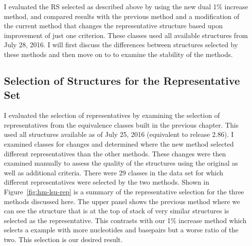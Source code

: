 I evaluated the RS selected as described above by using the new
dual 1\% increase method, and compared results with the previous method and a
modification of the current method that changes the representative structure
based upon improvement of just one criterion. These classes used all available
structures from July 28, 2016. I will first discuss the differences between
structures selected by these methods and then move on to to examine the
stability of the methods.

\subsection{Selection of Structures for the Representative Set}

I evaluated the selection of representatives by examining the selection of
representatives from the equivalence classes built in the previous chapter. This
used all structures available as of July 25, 2016 (equivalent to release 2.86).
I examined classes for changes and determined where the new method selected
different representatives than the other methods. These changes were then
examined manually to assess the quality of the structures using the original as
well as additional criteria. There were 29 classes in the data set for which
different representatives were selected by the two methods. Shown in
Figure~\ref{fig:hm-lsu-rep} is a summary of the representative selection for the
three methods discussed here. The upper panel shows the previous method where we
can see the structure that is at the top of stack of very similar structures is
selected as the representative. This contrasts with our 1\% increase method which
selects a example with more nucleotides and basepairs but a worse ratio of the
two. This selection is our desired result.

